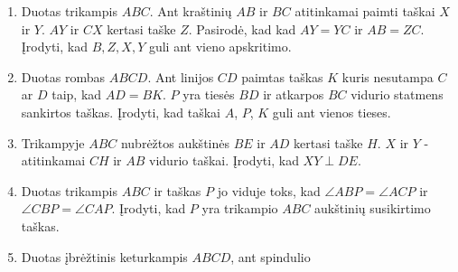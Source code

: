 \begin{enumerate}
\item Duotas trikampis $ABC$. Ant kraštinių $AB$ ir $BC$
  atitinkamai paimti taškai $X$ ir $Y$. $AY$ ir $CX$ kertasi
  taške $Z$. Pasirodė, kad kad $AY = YC$ ir $AB = ZC$.
  Įrodyti, kad $B, Z, X, Y$ guli ant vieno apskritimo.
\item Duotas rombas $ABCD$. Ant linijos $CD$ paimtas taškas
  $K$ kuris nesutampa $C$ ar $D$ taip, kad $AD = BK$. $P$
  yra tiesės $BD$ ir atkarpos $BC$ vidurio statmens
  sankirtos taškas. Įrodyti, kad taškai $A$, $P$, $K$ guli
  ant vienos tieses.
\item Trikampyje $ABC$ nubrėžtos aukštinės $BE$ ir $AD$
  kertasi taške $H$. $X$ ir $Y$ - atitinkamai $CH$ ir $AB$
  vidurio taškai. Įrodyti, kad $XY\perp{DE}$.
\item Duotas trikampis $ABC$ ir taškas $P$ jo viduje toks,
  kad $\angle ABP = \angle ACP$ ir $\angle CBP = \angle
  CAP$.  Įrodyti, kad $P$ yra trikampio $ABC$ aukštinių
  susikirtimo taškas.
\item Duotas įbrėžtinis keturkampis $ABCD$, ant spindulio

\end{enumerate}
